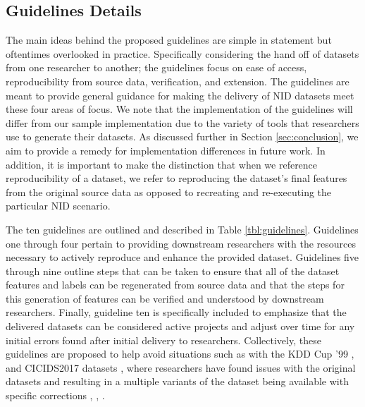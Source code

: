 \documentclass[sigconf]{acmart}
\begin{document}
\subsection{Guidelines Details}\label{subsec:framework_overview}
The main ideas behind the proposed guidelines are simple in statement but oftentimes overlooked in practice.
Specifically considering the hand off of datasets from one researcher to another; the guidelines focus on ease of access, reproducibility from source data, verification, and extension.
The guidelines are meant to provide general guidance for making the delivery of NID datasets meet these four areas of focus.
We note that the implementation of the guidelines will differ from our sample implementation due to the variety of tools that researchers use to generate their datasets.
As discussed further in Section \ref{sec:conclusion}, we aim to provide a remedy for implementation differences in future work.
In addition, it is important to make the distinction that when we reference reproducibility of a dataset, we refer to reproducing the dataset's final features from the original source data as opposed to recreating and re-executing the particular NID scenario.

The ten guidelines are outlined and described in Table \ref{tbl:guidelines}.
Guidelines one through four pertain to providing downstream researchers with the resources necessary to actively reproduce and enhance the provided dataset.
Guidelines five through nine outline steps that can be taken to ensure that all of the dataset features and labels can be regenerated from source data and that the steps for this generation of features can be verified and understood by downstream researchers.
Finally, guideline ten is specifically included to emphasize that the delivered datasets can be considered active projects and adjust over time for any initial errors found after initial delivery to researchers.
Collectively, these guidelines are proposed to help avoid situations such as with the KDD Cup '99 \cite{kdd99}, \cite{tavallaee2009detailed} and CICIDS2017 datasets \cite{sharafaldin2018toward}, where researchers have found issues with the original datasets and resulting in a multiple variants of the dataset being available with specific corrections \cite{tavallaee2009detailed}, \cite{lanvin:hal-03775466}, \cite{engelen2021}.
\end{document}
